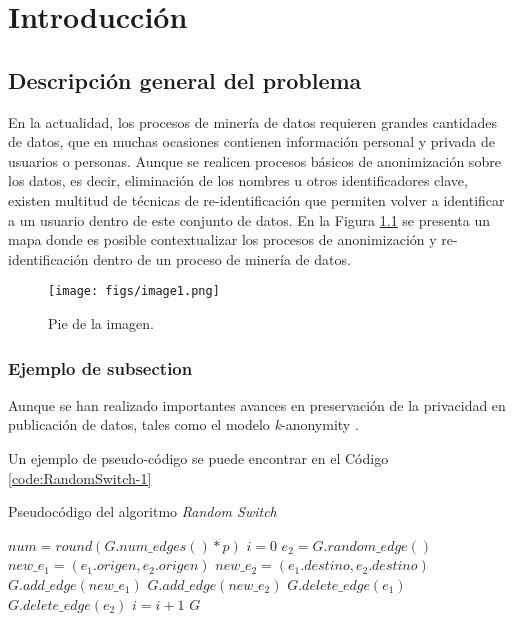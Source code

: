 \chapter{Introducción}
\label{chapter:introduccion}


\section{Descripción general del problema}

En la actualidad, los procesos de minería de datos requieren grandes cantidades de datos, que en muchas ocasiones contienen información personal y privada de usuarios o personas. Aunque se realicen procesos básicos de anonimización sobre los datos, es decir, eliminación de los nombres u otros identificadores clave, existen multitud de técnicas de re-identificación que permiten volver a identificar a un usuario dentro de este conjunto de datos. En la Figura \ref{fig:context-anoni1} se presenta un mapa donde es posible contextualizar los procesos de anonimización y re-identificación dentro de un proceso de minería de datos.

\begin{figure}
	\centering
	\texttt{[image: figs/image1.png]}
	\caption{Pie de la imagen.}
	\label{fig:context-anoni1}
\end{figure}

\subsection{Ejemplo de subsection}

Aunque se han realizado importantes avances en preservación de la privacidad en publicación de datos, tales como el modelo \textit{k}-anonymity \cite{Sweeney:2002}.

Un ejemplo de pseudo-código se puede encontrar en el Código \ref{code:RandomSwitch-1}

\begin{algorithm}
	\caption{Pseudocódigo del algoritmo \textit{Random Switch}}
	\label{code:RandomSwitch-1}
	\begin{algorithmic}
		\STATE $num = round(G.num\_edges() * p)$
		\STATE $i = 0$
		\STATE $e_{2} = G.random\_edge()$
		\STATE $new\_e_{1} = (e_{1}.origen, e_{2}.origen)$
		\STATE $new\_e_{2} = (e_{1}.destino, e_{2}.destino)$
		\STATE $G.add\_edge(new\_e_{1})$
		\STATE $G.add\_edge(new\_e_{2})$
		\STATE $G.delete\_edge(e_{1})$
		\STATE $G.delete\_edge(e_{2})$
		\STATE $i=i+1$
		\ENDIF
		\ENDWHILE
		\RETURN $G$
	\end{algorithmic}
\end{algorithm}

